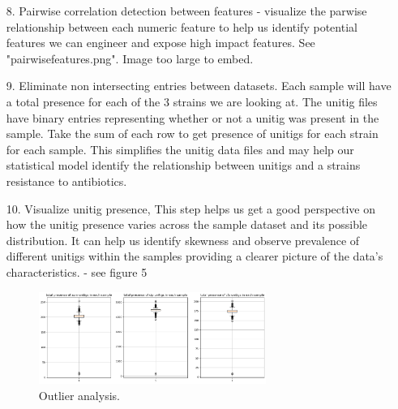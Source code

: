 \documentclass[manuscript,screen,review, nonacm]{acmart}
\begin{document}
\begin{itemize}
    \item[8.] Pairwise correlation detection between features - visualize the parwise relationship between each numeric feature to help us identify 
    potential features we can engineer and expose high impact features. See "pairwisefeatures.png". Image too large to embed. 

    \item[9.] Eliminate non intersecting entries between datasets. Each sample will have a total presence for each of the 3 strains we are looking at. The unitig files have binary entries representing whether or not a unitig was present in the sample. Take the sum of each row to get presence of unitigs for each strain for each sample. This simplifies the unitig data files and may help our statistical model identify the relationship between unitigs and a strains resistance to antibiotics.

    \item[10.] Visualize unitig presence, This step helps us get a good perspective on how the unitig presence varies across the sample dataset and its possible distribution. It can help us identify skewness and observe prevalence of different unitigs within the samples providing a clearer picture of the data's characteristics. - see figure 5

        \begin{figure}[H]
                \centering
                \vspace{-10pt}
                \includegraphics[width=0.7\textwidth]{figures/unitigdis.png}
                \caption{Outlier analysis.}
                \vspace{-10pt}
        \end{figure}


\end{itemize}
\end{document}
